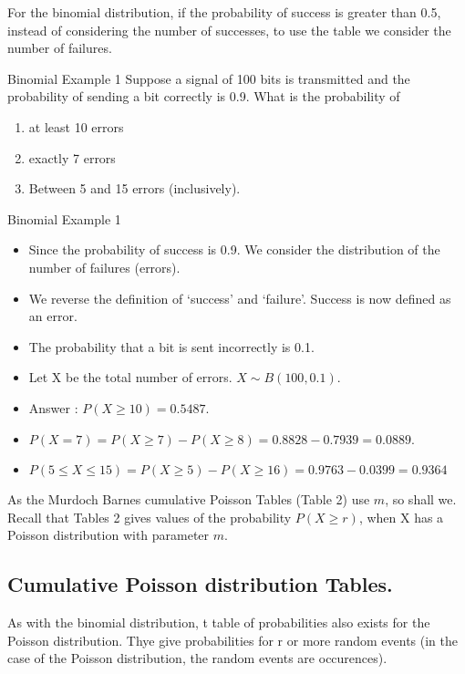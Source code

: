 \documentclass[]{report}
\begin{document}
For the binomial distribution, if the probability of success is greater than 0.5, instead of
considering the number of successes, to use the table we consider
the number of failures.




{Binomial Example 1}
Suppose a signal of 100 bits is transmitted and the probability of
sending a bit correctly is 0.9. What is the probability of
\begin{enumerate}
\item at least 10 errors
\item exactly 7 errors
\item Between 5 and 15 errors (inclusively).
\end{enumerate}


{Binomial Example 1}
\begin{itemize}
\item Since the probability of success is 0.9. We consider the distribution
of the number of failures (errors).
\item We reverse the definition of `success' and `failure'. Success is now defined as an error.
\item The probability that a bit is sent incorrectly is 0.1.
\item Let X be the total number of errors. $X \sim B(100, 0.1)$.
\item Answer : $P(X \geq 10) = 0.5487$.
\item $P(X = 7)=P(X \geq 7) - P(X \geq 8) =0.8828 - 0.7939 = 0.0889$.
\item $P(5 \leq X  \leq 15) = P(X \geq 5) - P(X \geq 16) =0.9763 - 0.0399 = 0.9364$
\end{itemize}



\bigskip
As the Murdoch Barnes cumulative Poisson Tables (Table 2) use $m$, so shall we. Recall that Tables 2 gives values of the probability $P(X \geq r )$, when X has a Poisson distribution with
parameter $m$.
\subsection{Cumulative Poisson distribution Tables.}
As with the binomial distribution, t table of probabilities also exists for the Poisson distribution. Thye give probabilities for r or more random events (in the case of the Poisson distribution, the random events are occurences).
\end{document}
